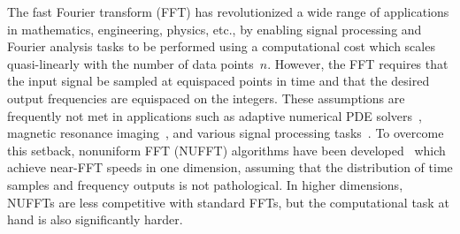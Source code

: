
The fast Fourier transform (FFT) has revolutionized a wide range of applications
in mathematics, engineering, physics, etc., by enabling signal processing and
Fourier analysis tasks to be performed using a computational cost which scales
quasi-linearly with the number of data points~$n$. However, the FFT requires
that the input signal be sampled at equispaced points in time and that the
desired output frequencies are equispaced on the integers. These assumptions are
frequently not met in applications such as adaptive numerical PDE
solvers~\cite{}, magnetic resonance
imaging~\cite{greengard2007fast,bondesson2019nonuniform,bronstein2002reconstruction},
and various signal processing tasks~\cite{}. To overcome this setback,
nonuniform FFT (NUFFT) algorithms have been
developed~\cite{dutt1993fast,greengard2004accelerating} which achieve near-FFT
speeds in one dimension, assuming that the distribution of time samples and
frequency outputs is not pathological. In higher dimensions, NUFFTs are less
competitive with standard FFTs, but the computational task at hand is also
significantly harder.

